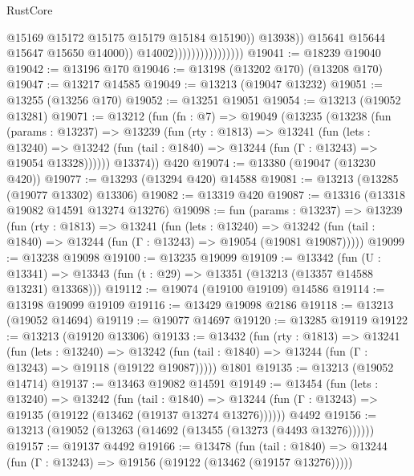\begin{lexlean}{RustCore}
\begin{coremodule}
                                                @15169
                                                @15172
                                                @15175
                                                @15179
                                                @15184
                                                @15190))
                                            @13938))
                                        @15641
                                        @15644
                                        @15647
                                        @15650
                                        @14000))
                                    @14002))))))))))))))))
@19041 := @18239 @19040
@19042 := @13196 @170
@19046 := @13198 (@13202 @170) (@13208 @170)
@19047 := @13217 @14585
@19049 := @13213 (@19047 @13232)
@19051 := @13255 (@13256 @170)
@19052 := @13251 @19051
@19054 := @13213 (@19052 @13281)
@19071 := @13212
    (fun (fn : @7) =>
    @19049
      (@13235
        (@13238
          (fun (params : @13237) =>
          @13239
            (fun (rty : @1813) =>
            @13241
              (fun (lets : @13240) =>
              @13242 (fun (tail : @1840) => @13244 (fun (Γ : @13243) => @19054 @13328))))))
        @13374))
    @420
@19074 := @13380 (@19047 (@13230 @420))
@19077 := @13293 (@13294 @420) @14588
@19081 := @13213 (@13285 (@19077 @13302) @13306)
@19082 := @13319 @420
@19087 := @13316 (@13318 @19082 @14591 @13274 @13276)
@19098 := fun (params : @13237) =>
  @13239
    (fun (rty : @1813) =>
    @13241
      (fun (lets : @13240) =>
      @13242 (fun (tail : @1840) => @13244 (fun (Γ : @13243) => @19054 (@19081 @19087)))))
@19099 := @13238 @19098
@19100 := @13235 @19099
@19109 := @13342
    (fun (U : @13341) => @13343 (fun (t : @29) => @13351 (@13213 (@13357 @14588 @13231) @13368)))
@19112 := @19074 (@19100 @19109) @14586
@19114 := @13198 @19099 @19109
@19116 := @13429 @19098 @2186
@19118 := @13213 (@19052 @14694)
@19119 := @19077 @14697
@19120 := @13285 @19119
@19122 := @13213 (@19120 @13306)
@19133 := @13432
    (fun (rty : @1813) =>
    @13241
      (fun (lets : @13240) =>
      @13242 (fun (tail : @1840) => @13244 (fun (Γ : @13243) => @19118 (@19122 @19087)))))
    @1801
@19135 := @13213 (@19052 @14714)
@19137 := @13463 @19082 @14591
@19149 := @13454
    (fun (lets : @13240) =>
    @13242
      (fun (tail : @1840) =>
      @13244 (fun (Γ : @13243) => @19135 (@19122 (@13462 (@19137 @13274 @13276))))))
    @4492
@19156 := @13213 (@19052 (@13263 (@14692 (@13455 (@13273 (@4493 @13276))))))
@19157 := @19137 @4492
@19166 := @13478
    (fun (tail : @1840) => @13244 (fun (Γ : @13243) => @19156 (@19122 (@13462 (@19157 @13276)))))

\end{coremodule}
\end{lexlean}
